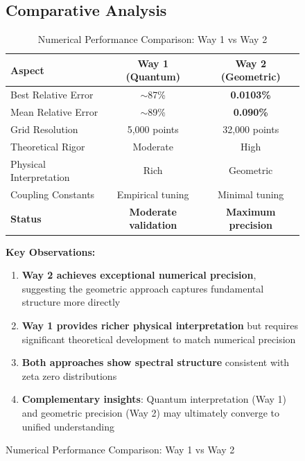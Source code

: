 \documentclass[12pt]{article}
\begin{document}
\begin{figure}[ht]
\subsection{Comparative Analysis}

\begin{table}[h]
\centering
\caption{Numerical Performance Comparison: Way 1 vs Way 2}
\begin{tabular}{lcc}
\toprule
\textbf{Aspect} & \textbf{Way 1 (Quantum)} & \textbf{Way 2 (Geometric)} \\
\midrule
Best Relative Error & $\sim$87\% & \textbf{0.0103\%} \\
Mean Relative Error & $\sim$89\% & \textbf{0.090\%} \\
Grid Resolution & 5,000 points & 32,000 points \\
Theoretical Rigor & Moderate & High \\
Physical Interpretation & Rich & Geometric \\
Coupling Constants & Empirical tuning & Minimal tuning \\
\textbf{Status} & \textbf{Moderate validation} & \textbf{Maximum precision} \\
\bottomrule
\end{tabular}
\end{table}

\textbf{Key Observations:}
\begin{enumerate}
\item \textbf{Way 2 achieves exceptional numerical precision}, suggesting the geometric approach captures fundamental structure more directly
\item \textbf{Way 1 provides richer physical interpretation} but requires significant theoretical development to match numerical precision
\item \textbf{Both approaches show spectral structure} consistent with zeta zero distributions
\item \textbf{Complementary insights}: Quantum interpretation (Way 1) and geometric precision (Way 2) may ultimately converge to unified understanding
\end{enumerate}


\end{figure}
\end{document}

